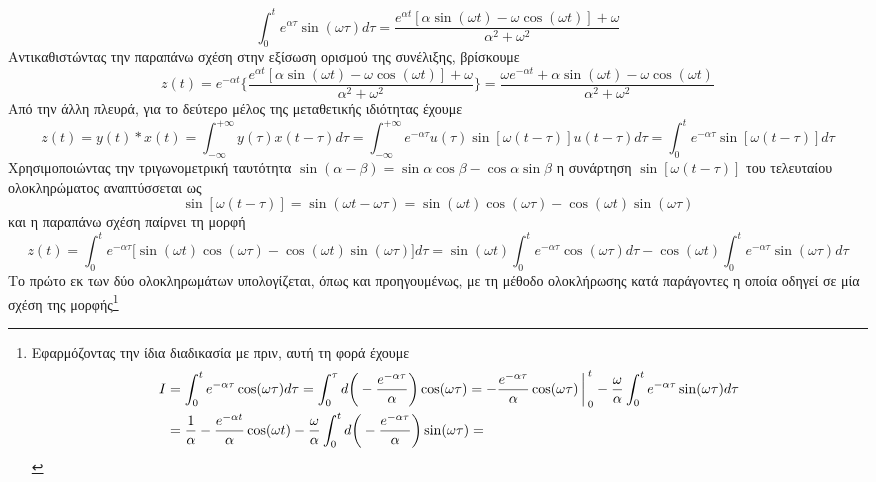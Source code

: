 \documentclass[a4paper,twoside,10pt,openany]{memoir}
\theoremstyle{dotless}
\begin{document}
\begin{solution}
{\begin{equation*}
\end{equation*}}
\begin{equation*}
\int_{0}^{t}e^{\alpha\tau}\sin(\omega\tau)d\tau=\frac{e^{\alpha t}[\alpha\sin(\omega t)-\omega\cos(\omega t)]+\omega}{\alpha^2+\omega^2}
\end{equation*}
Αντικαθιστώντας την παραπάνω σχέση στην εξίσωση ορισμού της συνέλιξης, βρίσκουμε
\begin{equation*}
z(t)=e^{-\alpha t}\bigg\{\frac{e^{\alpha t}
[\alpha\sin(\omega t)-\omega\cos(\omega t)]+\omega}{\alpha^2+\omega^2}\bigg\}
=\frac{\omega e^{-\alpha t}+\alpha\sin(\omega t)-\omega\cos(\omega t)}
{\alpha^2+\omega^2}
\end{equation*}
Από την άλλη πλευρά, για το δεύτερο μέλος της μεταθετικής ιδιότητας έχουμε
\begin{equation*}
z(t)=y(t)\ast x(t)=\int_{-\infty}^{+\infty}y(\tau)x(t-\tau)d\tau=\int_{-\infty}^{+\infty}e^{-\alpha\tau}u(\tau)
\sin[\omega(t-\tau)]u(t-\tau)d\tau=\int_{0}^{t}e^{-\alpha\tau}\sin[\omega(t-\tau)]d\tau
\end{equation*}
Χρησιμοποιώντας την τριγωνομετρική ταυτότητα $\sin(\alpha-\beta)=\sin\alpha\cos\beta-\cos\alpha\sin\beta$ η συνάρτηση $\sin[\omega(t-\tau)]$ του τελευταίου ολοκληρώματος αναπτύσσεται ως
\begin{equation*}
\sin[\omega(t-\tau)]=\sin(\omega t-\omega\tau)=\sin(\omega t)\cos(\omega\tau)-\cos(\omega t)\sin(\omega\tau)
\end{equation*}
και η παραπάνω σχέση παίρνει τη μορφή
\begin{equation*}
z(t)=\int_{0}^{t}e^{-\alpha\tau}\bigg[\sin(\omega t)\cos(\omega\tau)-\cos(\omega t)\sin(\omega\tau)\bigg]d\tau=
\sin(\omega t)\int_{0}^{t}e^{-\alpha\tau}\cos(\omega\tau)d\tau-\cos(\omega t)\int_{0}^{t}e^{-\alpha\tau}\sin(\omega\tau)d\tau
\end{equation*}
Το πρώτο εκ των δύο ολοκληρωμάτων υπολογίζεται, όπως και προηγουμένως, με τη μέθοδο ολοκλήρωσης κατά παράγοντες η οποία οδηγεί σε μία σχέση της μορφής\footnote{Εφαρμόζοντας την ίδια διαδικασία με πριν, αυτή τη φορά έχουμε
\begin{align*}
I&=\int_{0}^{t}e^{-\alpha\tau}\cos(\omega\tau)d\tau=
\int_{0}^{\tau}d\bigg(-\frac{e^{-\alpha\tau}}{\alpha}\bigg)\cos(\omega\tau)=
-\frac{e^{-\alpha\tau}}{\alpha}\cos(\omega\tau)\bigg\arrowvert_{0}^{t}
-\frac{\omega}{\alpha}\int_{0}^{t}e^{-\alpha\tau}\sin(\omega\tau)d\tau\\&=
\frac{1}{\alpha}-\frac{e^{-\alpha t}}{\alpha}\cos(\omega t)-\frac{\omega}{\alpha}\int_{0}^{t}
d\bigg(-\frac{e^{-\alpha\tau}}{\alpha}\bigg)\sin(\omega\tau)=

\end{align*}}
\end{solution}
\end{document}
